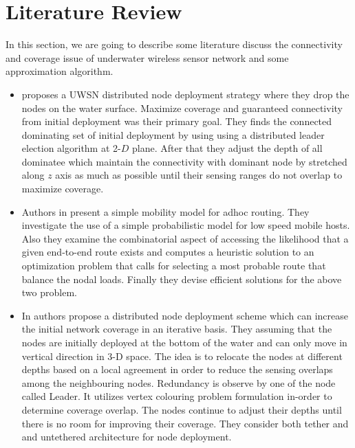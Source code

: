\documentclass[12pt]{article}
\begin{document}
\section{Literature Review}
In this section, we are going to describe some literature discuss the connectivity and coverage issue of underwater wireless sensor network and some approximation algorithm.
 \begin{itemize}%
 \item \cite{senel2013autonomous} proposes a UWSN distributed node deployment strategy where they drop the nodes on the water surface. Maximize coverage and guaranteed connectivity from initial deployment was their primary goal. They finds the connected dominating set of initial deployment by using using a distributed leader election algorithm at 2-$D$ plane. After that they adjust the depth of all dominatee which maintain the connectivity with dominant node by stretched along $z$ axis as much as possible until their sensing ranges do not overlap to maximize coverage.
 
 \item Authors in \cite{ProfEhab} present a simple mobility model for adhoc routing. They investigate the use of a simple probabilistic model for low speed mobile hosts. Also they examine the combinatorial aspect of accessing the likelihood that a given end-to-end route exists and computes a heuristic solution to an optimization problem that calls for selecting a most probable route that balance the nodal loads. Finally they devise efficient solutions for the above two problem.
 \item In \cite{akkaya2009self} authors propose a distributed node deployment scheme which can increase the initial network coverage in an iterative basis. They assuming that the nodes are initially deployed at the bottom of the water and can only move in vertical direction in 3-D space. The idea is to relocate the nodes at different depths based on a local agreement in order to reduce the sensing overlaps among the neighbouring nodes. Redundancy is observe by one  of the node called Leader. It utilizes vertex colouring problem formulation in-order to determine coverage overlap. The nodes continue to adjust their depths until there is no room for improving their coverage. They consider both tether and and untethered architecture for node deployment.
 

\end{itemize}
\end{document}
